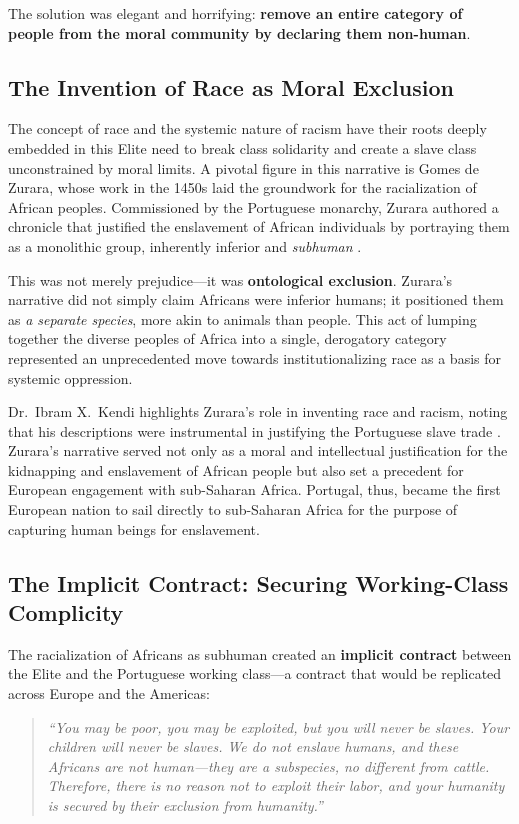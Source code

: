 \documentclass[12pt]{article}
\begin{document}
The solution was elegant and horrifying: \textbf{remove an entire category of people from the moral community by declaring them non-human}.

\subsection{The Invention of Race as Moral Exclusion}

The concept of race and the systemic nature of racism have their roots deeply embedded in this Elite need to break class solidarity and create a slave class unconstrained by moral limits. A pivotal figure in this narrative is Gomes de Zurara, whose work in the 1450s laid the groundwork for the racialization of African peoples. Commissioned by the Portuguese monarchy, Zurara authored a chronicle that justified the enslavement of African individuals by portraying them as a monolithic group, inherently inferior and \textit{subhuman} \cite{zurara, kendi}. 

This was not merely prejudice---it was \textbf{ontological exclusion}. Zurara's narrative did not simply claim Africans were inferior humans; it positioned them as \textit{a separate species}, more akin to animals than people. This act of lumping together the diverse peoples of Africa into a single, derogatory category represented an unprecedented move towards institutionalizing race as a basis for systemic oppression.

Dr.\ Ibram X.\ Kendi highlights Zurara's role in inventing race and racism, noting that his descriptions were instrumental in justifying the Portuguese slave trade \cite{kendi}. Zurara's narrative served not only as a moral and intellectual justification for the kidnapping and enslavement of African people but also set a precedent for European engagement with sub-Saharan Africa. Portugal, thus, became the first European nation to sail directly to sub-Saharan Africa for the purpose of capturing human beings for enslavement.

\subsection{The Implicit Contract: Securing Working-Class Complicity}

The racialization of Africans as subhuman created an \textbf{implicit contract} between the Elite and the Portuguese working class---a contract that would be replicated across Europe and the Americas:

\begin{quote}
\textit{``You may be poor, you may be exploited, but you will never be slaves. Your children will never be slaves. We do not enslave humans, and these Africans are not human---they are a subspecies, no different from cattle. Therefore, there is no reason not to exploit their labor, and your humanity is secured by their exclusion from humanity.''}
\end{quote}
\end{document}
